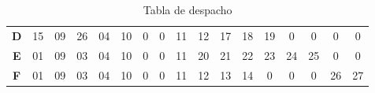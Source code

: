 \documentclass[12pt, twoside, openright]{report} %
\begin{document}
\begin{table}[H]
\begin{tabular}{ccccccccccccccccc}
		\multicolumn{1}{c|}{\textbf{D}} & \multicolumn{1}{c|}{15} & \multicolumn{1}{c|}{09} & \multicolumn{1}{c|}{26} & \multicolumn{1}{c|}{04} & \multicolumn{1}{c|}{10}                        & \multicolumn{1}{c|}{\cellcolor[HTML]{C0C0C0}0} & \multicolumn{1}{c|}{\cellcolor[HTML]{C0C0C0}0} & \multicolumn{1}{c|}{11}                        & \multicolumn{1}{c|}{12}                        & \multicolumn{1}{c|}{17}                        & \multicolumn{1}{c|}{18}                        & \multicolumn{1}{c|}{19}                        & \multicolumn{1}{c|}{\cellcolor[HTML]{C0C0C0}0} & \multicolumn{1}{c|}{\cellcolor[HTML]{C0C0C0}0} & \multicolumn{1}{c|}{\cellcolor[HTML]{C0C0C0}0} & \multicolumn{1}{c|}{\cellcolor[HTML]{C0C0C0}0} \\ \cline{2-17}
		\multicolumn{1}{c|}{\textbf{E}} & \multicolumn{1}{c|}{01} & \multicolumn{1}{c|}{09} & \multicolumn{1}{c|}{03} & \multicolumn{1}{c|}{04} & \multicolumn{1}{c|}{10}                        & \multicolumn{1}{c|}{\cellcolor[HTML]{C0C0C0}0} & \multicolumn{1}{c|}{\cellcolor[HTML]{C0C0C0}0} & \multicolumn{1}{c|}{11}                        & \multicolumn{1}{c|}{20}                        & \multicolumn{1}{c|}{21}                        & \multicolumn{1}{c|}{22}                        & \multicolumn{1}{c|}{23}                        & \multicolumn{1}{c|}{24}                        & \multicolumn{1}{c|}{25}                        & \multicolumn{1}{c|}{\cellcolor[HTML]{C0C0C0}0} & \multicolumn{1}{c|}{\cellcolor[HTML]{C0C0C0}0} \\ \cline{2-17}
		\multicolumn{1}{c|}{\textbf{F}} & \multicolumn{1}{c|}{01} & \multicolumn{1}{c|}{09} & \multicolumn{1}{c|}{03} & \multicolumn{1}{c|}{04} & \multicolumn{1}{c|}{10}                        & \multicolumn{1}{c|}{\cellcolor[HTML]{C0C0C0}0} & \multicolumn{1}{c|}{\cellcolor[HTML]{C0C0C0}0} & \multicolumn{1}{c|}{11}                        & \multicolumn{1}{c|}{12}                        & \multicolumn{1}{c|}{13}                        & \multicolumn{1}{c|}{14}                        & \multicolumn{1}{c|}{\cellcolor[HTML]{C0C0C0}0} & \multicolumn{1}{c|}{\cellcolor[HTML]{C0C0C0}0} & \multicolumn{1}{c|}{\cellcolor[HTML]{C0C0C0}0} & \multicolumn{1}{c|}{26}                        & \multicolumn{1}{c|}{27}                        \\ \cline{2-17}
	\end{tabular}
	\caption{Tabla de despacho}
\end{table}
\end{document}
